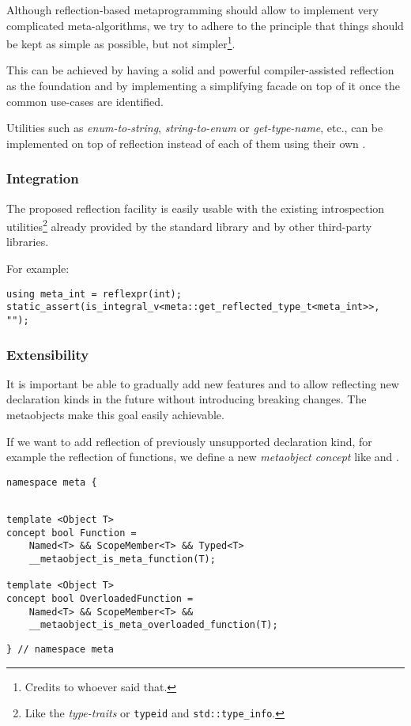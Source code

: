 Although reflection-based metaprogramming should allow to implement very
complicated meta-algorithms, we try to adhere to the principle that things
should be kept as simple as possible, but not simpler\footnote{Credits to
whoever said that.}.

This can be achieved by having a solid and powerful compiler-assisted reflection
as the foundation and by implementing a simplifying facade on top of it once
the common use-cases are identified.

Utilities such as {\em enum-to-string}, {\em string-to-enum} or {\em get-type-name},
etc., can be implemented on top of reflection instead of each of them using their own
.

\subsubsection{Integration}
\label{design-integration}

The proposed reflection facility is easily
usable with the existing introspection utilities\footnote{Like the
{\em type-traits} or \texttt{typeid} and \texttt{std::type\_info}.}
already provided by the standard library and by other third-party libraries.

For example:

\begin{verbatim}
using meta_int = reflexpr(int);
static_assert(is_integral_v<meta::get_reflected_type_t<meta_int>>, "");
\end{verbatim}

\subsubsection{Extensibility}
\label{design-extensibility}

It is important be able to gradually add new features and to allow
reflecting new declaration kinds in the future without introducing breaking changes.
The metaobjects make this goal easily achievable.

If we want to add reflection of previously unsupported declaration kind, for example
the reflection of functions, we define a new {\em metaobject concept} like
 and .

\begin{verbatim}
namespace meta {
\end{verbatim}
\begin{verbatim}

template <Object T>
concept bool Function = 
	Named<T> && ScopeMember<T> && Typed<T>
	__metaobject_is_meta_function(T);

template <Object T>
concept bool OverloadedFunction =
	Named<T> && ScopeMember<T> &&
	__metaobject_is_meta_overloaded_function(T);

\end{verbatim}
\begin{verbatim}
} // namespace meta
\end{verbatim}

